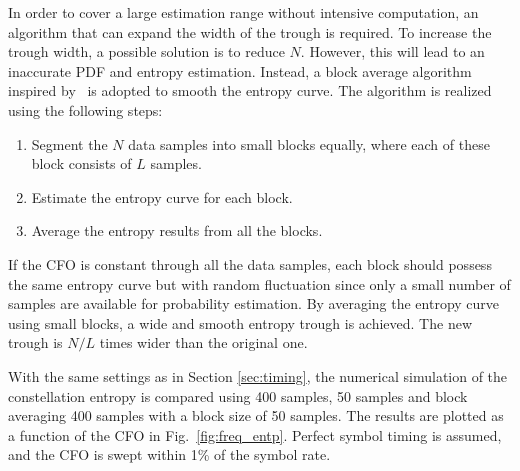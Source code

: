 \documentclass[12pt, draftclsnofoot, onecolumn]{IEEEtran}
\begin{document}
In order to cover a large estimation range without intensive computation, an algorithm that can expand the width of the trough is required.
To increase the trough width, a possible solution is to reduce \(N\).
However, this will lead to an inaccurate PDF and entropy estimation.
Instead, a block average algorithm inspired by~\cite{YuanlingHuang2007} is adopted to smooth the entropy curve. The algorithm is realized using the following steps:

\begin{enumerate}
\item Segment the \(N\) data samples into small blocks equally, where each of these block consists of \(L\) samples. 
\item Estimate the entropy curve for each block.
\item Average the entropy results from all the blocks.
\end{enumerate}
If the CFO is constant through all the data samples, each block should possess the same entropy curve but with random fluctuation since only a small number of samples are available for probability estimation.
By averaging the entropy curve using small blocks, a wide and smooth entropy trough is achieved.
The new trough is $N/L$ times wider than the original one.

With the same settings as in Section \ref{sec:timing}, the numerical simulation of the constellation entropy is compared using 400 samples, 50 samples and block averaging 400 samples with a block size of 50 samples.
The results are plotted as a function of the CFO in Fig.~\ref{fig:freq_entp}.
Perfect symbol timing is assumed, and the CFO is swept within 1\% of the symbol rate.

\end{document}
